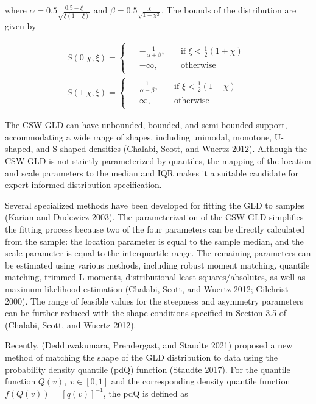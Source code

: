 \documentclass[
]{interact}
\begin{document}
where \(\alpha=0.5\frac{0.5-\xi}{\sqrt{\xi(1-\xi)}}\) and
\(\beta=0.5\frac{\chi}{\sqrt{1-\chi^2}}\). The bounds of the
distribution are given by

\[
\begin{gathered}
S(0\vert\chi,\xi)=\begin{cases}
\begin{aligned}
&-\frac{1}{\alpha+\beta},\quad &\text{if }\xi<\frac{1}{2}(1+\chi)\\
&-\infty, \quad &\text{otherwise}
\end{aligned}
\end{cases}\\
S(1\vert\chi,\xi)=\begin{cases}
\begin{aligned}
&\frac{1}{\alpha-\beta},\quad &\text{if }\xi<\frac{1}{2}(1-\chi)\\
&\infty, \quad &\text{otherwise}
\end{aligned}
\end{cases}
\end{gathered}
\]

The CSW GLD can have unbounded, bounded, and semi-bounded support,
accommodating a wide range of shapes, including unimodal, monotone,
U-shaped, and S-shaped densities (Chalabi, Scott, and Wuertz 2012).
Although the CSW GLD is not strictly parameterized by quantiles, the
mapping of the location and scale parameters to the median and IQR makes
it a suitable candidate for expert-informed distribution specification.

Several specialized methods have been developed for fitting the GLD to
samples (Karian and Dudewicz 2003). The parameterization of the CSW GLD
simplifies the fitting process because two of the four parameters can be
directly calculated from the sample: the location parameter is equal to
the sample median, and the scale parameter is equal to the interquartile
range. The remaining parameters can be estimated using various methods,
including robust moment matching, quantile matching, trimmed L-moments,
distributional least squares/absolutes, as well as maximum likelihood
estimation (Chalabi, Scott, and Wuertz 2012; Gilchrist 2000). The range
of feasible values for the steepness and asymmetry parameters can be
further reduced with the shape conditions specified in Section 3.5 of
(Chalabi, Scott, and Wuertz 2012).

Recently, (Dedduwakumara, Prendergast, and Staudte 2021) proposed a new
method of matching the shape of the GLD distribution to data using the
probability density quantile (pdQ) function (Staudte 2017). For the
quantile function \(Q(v), \; v\in [0,1]\) and the corresponding density
quantile function \(f(Q(v))=[q(v)]^{-1}\), the pdQ is defined as
\end{document}
